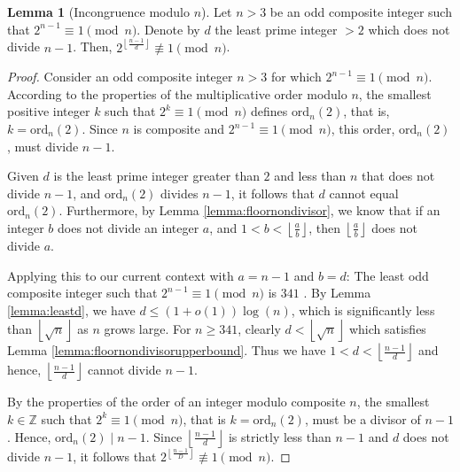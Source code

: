 \documentclass{article}
\theoremstyle{plain}
\theoremstyle{definition}
\newtheorem{lemma}{Lemma}
\newcommand{\ordn}[1]{\text{ord}_n\left({#1}\right)}
\begin{document}
\begin{lemma}[Incongruence modulo $n$] \label{lemma:incongruencemodn}
Let \( n > 3 \) be an odd composite integer such that \( 2^{n-1} \equiv 1 \pmod{n} \). Denote by \( d \) the least prime integer \( > 2 \) which does not divide \( n-1 \). Then, \( 2^{\left\lfloor\frac{n-1}{d}\right\rfloor} \not\equiv 1 \pmod{n} \).
\end{lemma}
\begin{proof}
Consider an odd composite integer \( n > 3 \) for which \( 2^{n-1} \equiv 1 \pmod{n} \). According to the properties of the multiplicative order modulo $n$, the smallest positive integer \( k \) such that \( 2^k \equiv 1 \pmod{n} \) defines \( \ordn{2} \), that is, \( k = \ordn{2} \). Since $n$ is composite and \( 2^{n-1} \equiv 1 \pmod{n} \), this order, \( \ordn{2} \), must divide \( n-1 \).

Given \( d \) is the least prime integer greater than $2$ and less than \( n \) that does not divide \( n-1 \), and \( \ordn{2} \) divides \( n-1 \), it follows that $d$ cannot equal \( \ordn{2} \). Furthermore, by Lemma \ref{lemma:floornondivisor}, we know that if an integer \( b \) does not divide an integer \( a \), and \( 1 < b < \left\lfloor \frac{a}{b} \right\rfloor \), then \( \left\lfloor \frac{a}{b} \right\rfloor \) does not divide \( a \).

Applying this to our current context with \( a = n-1 \) and \( b = d \): The least odd composite integer such that \( 2^{n-1} \equiv 1 \pmod{n} \) is $341$ \cite{oeisfermatpspbase2}. By Lemma \ref{lemma:leastd}, we have $d \leq (1 + o(1)) \log(n)$, which is significantly less than $\left\lfloor\sqrt{n}\right\rfloor$ as $n$ grows large. For $n \geq 341$, clearly $d < \left\lfloor\sqrt{n}\right\rfloor$ which satisfies Lemma \ref{lemma:floornondivisorupperbound}. Thus we have \( 1 < d < \left\lfloor \frac{n-1}{d} \right\rfloor \) and hence, \( \left\lfloor \frac{n-1}{d} \right\rfloor \) cannot divide \( n-1 \).

By the properties of the order of an integer modulo composite $n$, the smallest $k \in \mathbb{Z}$ such that $2^k \equiv 1 \pmod{n}$, that is $k = \ordn{2}$, must be a divisor of $n-1$. Hence, $\ordn{2} \mid n-1$. Since $\left\lfloor\frac{n-1}{d}\right\rfloor$ is strictly less than $n-1$ and $d$ does not divide $n-1$, it follows that $2^{\left\lfloor\frac{n-1}{D}\right\rfloor} \not\equiv 1 \pmod{n}$.
\end{proof}
\end{document}
